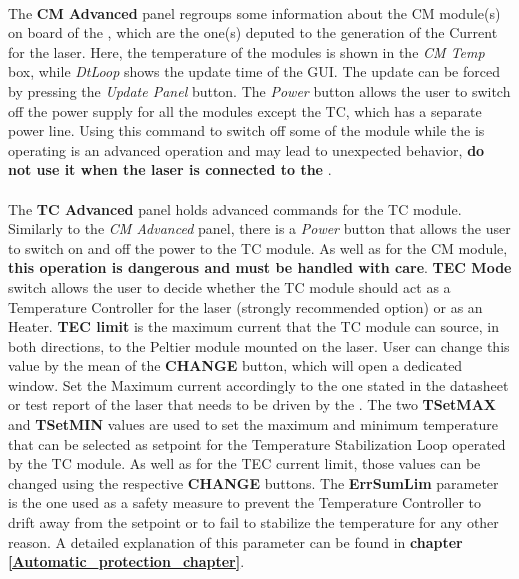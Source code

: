 \paragraph{} The \textbf{CM Advanced} panel regroups some information about the CM module(s) on board of the \QubeModel , which are the one(s) deputed to the generation of the Current for the laser. Here, the temperature of the modules is shown in the \textit{CM Temp} box, while \textit{DtLoop} shows the update time of the GUI. The update can be forced by pressing the \textit{Update Panel} button.
\newline The \textit{Power} button allows the user to switch off the power supply for all the modules except the TC, which has a separate power line. Using this command to switch off some of the module while the \QubeModel  is operating is an advanced operation and may lead to unexpected behavior, \textbf{do not use it when the laser is connected to the \QubeModel }.

\paragraph{} The \textbf{TC Advanced} panel holds advanced commands for the TC module. Similarly to the \textit{CM Advanced} panel, there is a \textit{Power} button that allows the user to switch on and off the power to the TC module. As well as for the CM module, \textbf{this operation is dangerous and must be handled with care}.
\newline \textbf{TEC Mode} switch allows the user to decide whether the TC module should act as a Temperature Controller for the laser (strongly recommended option) or as an Heater.
\newline \textbf{TEC limit} is the maximum current that the TC module can source, in both directions, to the Peltier module mounted on the laser. User can change this value by the mean of the \textbf{CHANGE} button, which will open a dedicated window. Set the Maximum current accordingly to the one stated in the datasheet or test report of the laser that needs to be driven by the \QubeModel .
\newline The two \textbf{TSetMAX} and \textbf{TSetMIN} values are used to set the maximum and minimum temperature that can be selected as setpoint for the Temperature Stabilization Loop operated by the TC module. As well as for the TEC current limit, those values can be changed using the respective \textbf{CHANGE} buttons.
\newline The \textbf{ErrSumLim} parameter is the one used as a safety measure to prevent the Temperature Controller to drift away from the setpoint or to fail to stabilize the temperature for any other reason. A detailed explanation of this parameter can be found in \textbf{chapter \ref{Automatic_protection_chapter}}.

